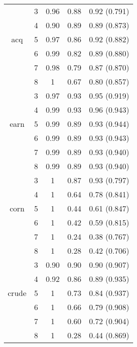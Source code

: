 \begin{table}[]
{\begin{tabular}{| c | c | c | c | c | }
		& 3 & 0.96 & 0.88 & 0.92 (0.791)    \\ 
		& 4 & 0.90 & 0.89 &  0.89 (0.873)   \\
		acq	& 5 & 0.97 & 0.86 & 0.92  (0.882)   \\ 
		& 6 & 0.99 & 0.82 & 0.89  (0.880)   \\
		& 7 & 0.98 & 0.79 & 0.87  (0.870)   \\
		& 8 & 1 & 0.67 & 0.80  (0.857)   \\
		\hline
		
		
		
		& 3 & 0.97 & 0.93 &  0.95 (0.919)   \\ 
		& 4 & 0.99 & 0.93 &  0.96 (0.943)   \\ 
		earn & 5 & 0.99 & 0.89 &  0.93  (0.944)  \\ 
		& 6 & 0.99 & 0.89 &  0.93  (0.943)  \\ 
		& 7 & 0.99 & 0.89 &  0.93  (0.940)  \\ 
		& 8 & 0.99 & 0.89 &  0.93  (0.940)  \\ \hline
		
		
		
		& 3 & 1 & 0.87 & 0.93  (0.797)   \\ 
		& 4 & 1 & 0.64 & 0.78  (0.841)   \\ 
		corn	& 5 & 1 & 0.44 &  0.61 (0.847)   \\ 
		& 6 & 1 & 0.42 & 0.59  (0.815)   \\ 
		& 7 & 1 & 0.24 & 0.38  (0.767)  \\ 
		& 8 & 1 & 0.28& 0.42  (0.706)   \\ \hline
		
		
		& 3 & 0.90 & 0.90 &  0.90  (0.907)  \\ 
		& 4 & 0.92 & 0.86 & 0.89  (0.935)   \\ 
		crude & 5 & 1 & 0.73 &  0.84 (0.937)   \\ 
		& 6 & 1 & 0.66 &  0.79 (0.908)   \\
		& 7 & 1 & 0.60 &  0.72 (0.904)   \\
		& 8 & 1 & 0.28 &  0.44  (0.869)  \\ \hline
		
		
		
	\end{tabular}} 

\end{table}
